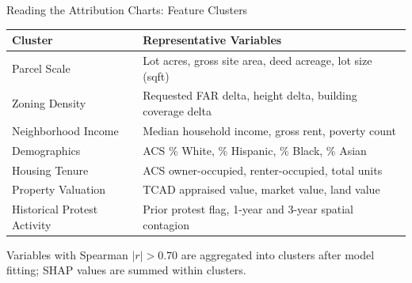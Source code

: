 \documentclass[10pt, aspectratio=169]{beamer}
\begin{document}
\begin{frame}{Reading the Attribution Charts: Feature Clusters}
 \small
 \begin{tabular}{p{3.2cm} p{8.5cm}}
 \toprule
 \textbf{Cluster} & \textbf{Representative Variables} \\
 \midrule
 Parcel Scale & Lot acres, gross site area, deed acreage, lot size (sqft) \\
 Zoning Density & Requested FAR delta, height delta, building coverage delta \\
 Neighborhood Income & Median household income, gross rent, poverty count \\
 Demographics & ACS \% White, \% Hispanic, \% Black, \% Asian \\
 Housing Tenure & ACS owner-occupied, renter-occupied, total units \\
 Property Valuation & TCAD appraised value, market value, land value \\
 Historical Protest Activity & Prior protest flag, 1-year and 3-year spatial contagion \\
 \bottomrule
 \end{tabular}
 \vspace{0.5em}

 \footnotesize Variables with Spearman $|r|>0.70$ are aggregated into clusters after model fitting; SHAP values are summed within clusters.
\end{frame}
\end{document}
